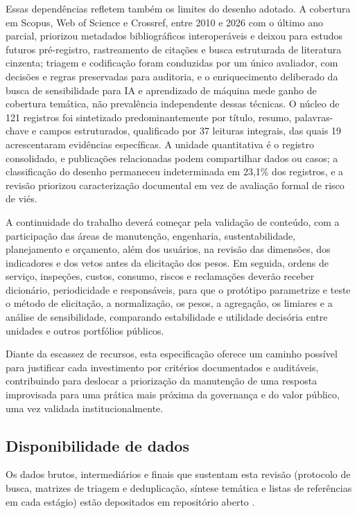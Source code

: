 Essas dependências refletem também os limites do desenho adotado. A cobertura em Scopus, Web of Science e Crossref, entre 2010 e 2026 com o último ano parcial, priorizou metadados bibliográficos interoperáveis e deixou para estudos futuros pré-registro, rastreamento de citações e busca estruturada de literatura cinzenta; triagem e codificação foram conduzidas por um único avaliador, com decisões e regras preservadas para auditoria, e o enriquecimento deliberado da busca de sensibilidade para IA e aprendizado de máquina mede ganho de cobertura temática, não prevalência independente dessas técnicas. O núcleo de 121 registros foi sintetizado predominantemente por título, resumo, palavras-chave e campos estruturados, qualificado por 37 leituras integrais, das quais 19 acrescentaram evidências específicas. A unidade quantitativa é o registro consolidado, e publicações relacionadas podem compartilhar dados ou casos; a classificação do desenho permaneceu indeterminada em 23,1\% dos registros, e a revisão priorizou caracterização documental em vez de avaliação formal de risco de viés.

A continuidade do trabalho deverá começar pela validação de conteúdo, com a participação das áreas de manutenção, engenharia, sustentabilidade, planejamento e orçamento, além dos usuários, na revisão das dimensões, dos indicadores e dos vetos antes da elicitação dos pesos. Em seguida, ordens de serviço, inspeções, custos, consumo, riscos e reclamações deverão receber dicionário, periodicidade e responsáveis, para que o protótipo parametrize e teste o método de elicitação, a normalização, os pesos, a agregação, os limiares e a análise de sensibilidade, comparando estabilidade e utilidade decisória entre unidades e outros portfólios públicos.

Diante da escassez de recursos, esta especificação oferece um caminho possível para justificar cada investimento por critérios documentados e auditáveis, contribuindo para deslocar a priorização da manutenção de uma resposta improvisada para uma prática mais próxima da governança e do valor público, uma vez validada institucionalmente.

\subsection{Disponibilidade de dados}
\label{sec:disponibilidadedados}

Os dados brutos, intermediários e finais que sustentam esta revisão (protocolo de busca, matrizes de triagem e deduplicação, síntese temática e listas de referências em cada estágio) estão depositados em repositório aberto \parencite{oliveira_dadosuplementares_2026}.
